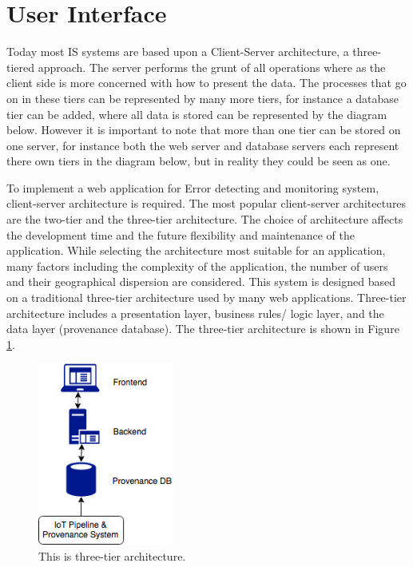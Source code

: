 \section{User Interface}

    Today most IS systems are based upon a Client-Server architecture, a three-tiered approach. The server performs the grunt of all operations where as the client side is more concerned with how to present the data. The processes that go on in these tiers can be represented by many more tiers, for instance a database tier can be added, where all data is stored can be represented by the diagram below. However it is important to note that more than one tier can be stored on one server, for instance both the web server and database servers each represent there own tiers in the diagram below, but in reality they could be seen as one.

    To  implement  a  web  application for Error detecting and monitoring system, client-server  architecture  is  required.  The  most  popular  client-server architectures  are  the  two-tier  and  the  three-tier architecture. The choice   of   architecture   affects   the   development   time   and   the   future   flexibility   and maintenance  of  the  application.  While  selecting the  architecture  most  suitable  for  an  application, many  factors  including  the complexity  of  the  application,  the  number  of  users and their geographical dispersion are considered. This system  is designed  based  on  a  traditional  three-tier  architecture  used  by  many  web  applications. Three-tier architecture  includes  a  presentation layer,  business  rules/  logic  layer, and the data layer (provenance database). The three-tier architecture is shown in Figure \ref{fig:architecture}.

    \begin{figure}
        \centering
        \includegraphics[width=0.4\textwidth]{figures/architecture.jpg}
        \caption{\label{fig:architecture}This is three-tier architecture.}
    \end{figure}

